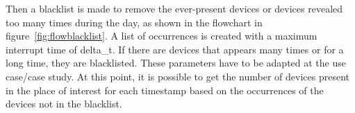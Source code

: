 
Then a blacklist is made to remove the ever-present devices or devices revealed too many times during the day, as shown in the flowchart in figure~\ref{fig:flowblacklist}. A list of occurrences is created with a maximum interrupt time of delta\_t. If there are devices that appears many times or for a long time, they are blacklisted. These parameters have to be adapted at the use case/case study.
At this point, it is possible to get the number of devices present in the place of interest for each timestamp based on the occurrences of the devices not in the blacklist. 


